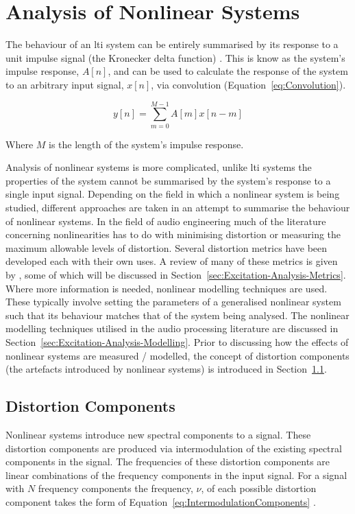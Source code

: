 \section{Analysis of Nonlinear Systems}
\label{sec:Excitation-AnalysisOfNonlinearSystems}
	The behaviour of an \acrshort{lti} system can be entirely summarised by its response to a unit impulse signal (the
	Kronecker delta function) \citep{phillips2007signals}. This is know as the system's impulse response, $A[n]$, and
	can be used to calculate the response of the system to an arbitrary input signal, $x[n]$, via convolution
	(Equation~\ref{eq:Convolution}).

	\begin{equation}
		y[n] = \sum_{m = 0}^{M - 1} A[m]x[n-m]
		\label{eq:Convolution}
	\end{equation}

	Where $M$ is the length of the system's impulse response.
	
	Analysis of nonlinear systems is more complicated, unlike \acrshort{lti} systems the properties of the system
	cannot be summarised by the system's response to a single input signal. Depending on the field in which a nonlinear
	system is being studied, different approaches are taken in an attempt to summarise the behaviour of nonlinear
	systems. In the field of audio engineering much of the literature concerning nonlinearities has to do with
	minimising distortion or measuring the maximum allowable levels of distortion. Several distortion metrics have been
	developed each with their own uses. A review of many of these metrics is given by \citet{voishvillo2006assessment},
	some of which will be discussed in Section~\ref{sec:Excitation-Analysis-Metrics}.  Where more information is
	needed, nonlinear modelling techniques are used.  These typically involve setting the parameters of a generalised
	nonlinear system such that its behaviour matches that of the system being analysed. The nonlinear modelling
	techniques utilised in the audio processing literature are discussed in
	Section~\ref{sec:Excitation-Analysis-Modelling}. Prior to discussing how the effects of nonlinear systems are
	measured / modelled, the concept of distortion components (the artefacts introduced by nonlinear systems) is
	introduced in Section~\ref{sec:Excitation-Analysis-Components}.

	\subsection{Distortion Components}
	\label{sec:Excitation-Analysis-Components}
		Nonlinear systems introduce new spectral components to a signal. These distortion components are produced
		via intermodulation of the existing spectral components in the signal. The frequencies of these distortion
		components are linear combinations of the frequency components in the input signal. For a signal with $N$
		frequency components the frequency, $\nu$, of each possible distortion component takes the form of
		Equation~\ref{eq:IntermodulationComponents} \citep{hulick2005solid}.

